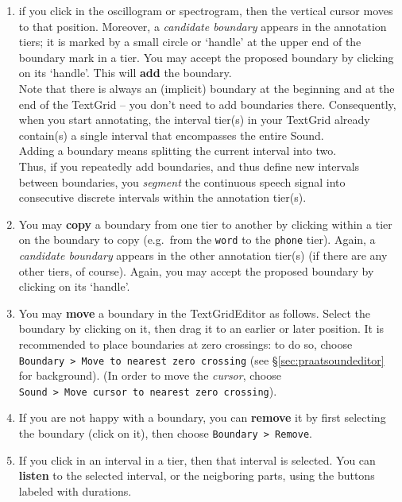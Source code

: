 \documentclass[
]{book}
\begin{document}
\begin{enumerate}
\def\labelenumi{(\alph{enumi})}
\item
  if you click in the oscillogram or spectrogram, then the vertical cursor moves to that position. Moreover, a \emph{candidate boundary} appears in the annotation tiers; it is marked by a small circle or `handle' at the upper end of the boundary mark in a tier. You may accept the proposed boundary by clicking on its `handle'. This will \textbf{add} the boundary.\\
  Note that there is always an (implicit) boundary at the beginning and at the end of the TextGrid -- you don't need to add boundaries there. Consequently, when you start annotating, the interval tier(s) in your TextGrid already contain(s) a single interval that encompasses the entire Sound.\\
  Adding a boundary means splitting the current interval into two.\\
  Thus, if you repeatedly add boundaries, and thus define new intervals between boundaries, you \emph{segment} the continuous speech signal into consecutive discrete intervals within the annotation tier(s).\\
\item
  You may \textbf{copy} a boundary from one tier to another by clicking within a tier on the boundary to copy (e.g.~from the \texttt{word} to the \texttt{phone} tier). Again, a \emph{candidate boundary} appears in the other annotation tier(s) (if there are any other tiers, of course). Again, you may accept the proposed boundary by clicking on its `handle'.\\
\item
  You may \textbf{move} a boundary in the TextGridEditor as follows. Select the boundary by clicking on it, then drag it to an earlier or later position. It is recommended to place boundaries at zero crossings: to do so, choose \texttt{Boundary\ \textgreater{}\ Move\ to\ nearest\ zero\ crossing} (see §\ref{sec:praatsoundeditor} for background). (In order to move the \emph{cursor}, choose \texttt{Sound\ \textgreater{}\ Move\ cursor\ to\ nearest\ zero\ crossing}).\\
\item
  If you are not happy with a boundary, you can \textbf{remove} it by first selecting the boundary (click on it), then choose \texttt{Boundary\ \textgreater{}\ Remove}.\\
\item
  If you click in an interval in a tier, then that interval is selected. You can \textbf{listen} to the selected interval, or the neigboring parts, using the buttons labeled with durations.\\

\end{enumerate}
\end{document}
